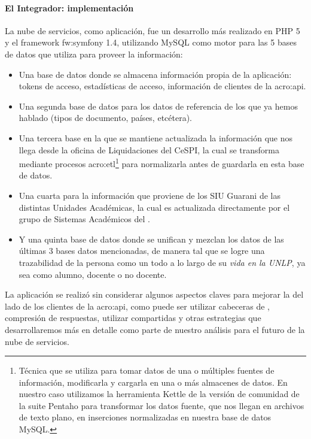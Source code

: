 \paragraph{El Integrador: implementación}

La nube de servicios, como aplicación, fue un desarrollo más realizado en PHP 5 y el framework \gls{fw:symfony} 1.4, utilizando MySQL como motor para las 5 bases de datos que utiliza para proveer la información:

\begin{itemize}
  \item Una base de datos donde se almacena información propia de la aplicación: tokens de acceso, estadísticas de acceso, información de clientes de la \gls{acro:api}.

  \item Una segunda base de datos para los datos de referencia de los que ya hemos hablado (tipos de documento, países, etcétera).

  \item Una tercera base en la que se mantiene actualizada la información que nos llega desde la oficina de Liquidaciones del CeSPI, la cual se transforma mediante procesos \gls{acro:etl}\footnote{Técnica que se utiliza para tomar datos de una o múltiples fuentes de información, modificarla y cargarla en una o más almacenes de datos. En nuestro caso utilizamos la herramienta Kettle de la versión de comunidad de la suite Pentaho para transformar los datos fuente, que nos llegan en archivos de texto plano, en inserciones normalizadas en nuestra base de datos MySQL.}\cite{paper:etl} para normalizarla antes de guardarla en esta base de datos.

  \item Una cuarta para la información que proviene de los SIU Guarani de las distintas Unidades Académicas, la cual es actualizada directamente por el grupo de Sistemas Académicos del {\cespi}.

  \item Y una quinta base de datos donde se unifican y mezclan los datos de las últimas 3 bases datos mencionadas, de manera tal que se logre una trazabilidad de la persona como un todo a lo largo de su \textit{vida en la UNLP}, ya sea como alumno, docente o no docente.
\end{itemize}

La aplicación se realizó sin considerar algunos aspectos claves para mejorar la  del lado de los clientes de la \gls{acro:api}, como puede ser utilizar cabeceras de , compresión de respuestas, utilizar  compartidas y otras estrategias que desarrollaremos más en detalle como parte de nuestro análisis para el futuro de la nube de servicios.

